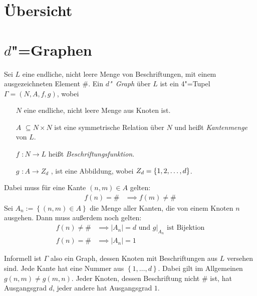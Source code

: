 \documentclass[11pt]{article}
\newcommand{\defWord}[1]{\emph{#1}}
\begin{document}
\clearpage


\section{Übersicht}

\section{$d$"=Graphen}
\begin{definition}[$d$"~Graph]
Sei $L$ eine endliche, nicht leere Menge von Beschriftungen, mit einem ausgezeichneten Element $\#$. 
Ein \defWord{$d$"~Graph} über $L$ ist ein 4"=Tupel $\Gamma = \left(N, A, f, g\right)$, wobei
\begin{itemize}
	\item[$N$] eine endliche, nicht leere Menge aus Knoten ist.
	\item[$A$] $\subseteq N \times N$ ist eine symmetrische Relation über $N$ und heißt \defWord{Kantenmenge} von $L$.
	\item[$f$] $: N \rightarrow L$  heißt \defWord{Beschriftungsfunktion}.
	\item[$g$] $: A \rightarrow Z_d$ , ist eine Abbildung, wobei $Z_d = \left \{1, 2,\text{\dots}, d \right \}$. 
\end{itemize}
Dabei muss für eine Kante $\left(n, m\right) \in A$ gelten:
\begin{align*}
f(n) = \# &\implies f(m) \neq \#
\end{align*}
Sei $A_n := \left \{\left(n, m\right) \in A\right \}$ die Menge aller Kanten, die von einem Knoten $n$ ausgehen. Dann muss außerdem noch gelten:
\begin{align*}
f(n) \neq \# &\implies  \left|A_n\right| = d \text{ und } g \vert_{A_n} \text{ ist Bijektion} \\
f(n) = \# &\implies\left|A_n\right| = 1
\end{align*}

\end{definition}

Informell ist $\Gamma$ also ein Graph, dessen Knoten mit Beschriftungen aus $L$ versehen sind. 
Jede Kante hat eine Nummer aus $\left\{1, \dots, d\right\}$. 
Dabei gilt im Allgemeinen $g(n, m) \neq g(m, n)$. 
Jeder Knoten, dessen Beschriftung nicht $\#$ ist, hat Ausgangsgrad $d$, jeder andere hat Ausgangsgrad $1$. 
\end{document}
